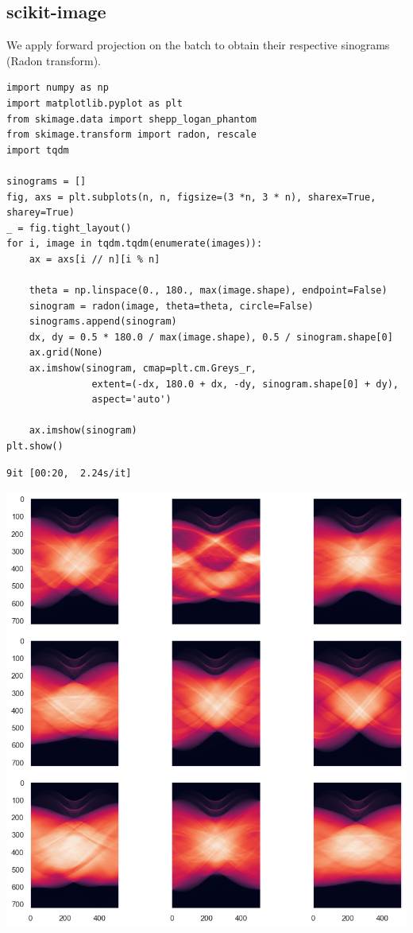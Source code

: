 \documentclass[a4paper, 11pt]{article}
\begin{document}
\subsection{scikit-image}
\label{sec:org595aee9}
We apply forward projection on the batch to obtain their respective sinograms (Radon transform).
\begin{verbatim}
import numpy as np
import matplotlib.pyplot as plt
from skimage.data import shepp_logan_phantom
from skimage.transform import radon, rescale
import tqdm

sinograms = []
fig, axs = plt.subplots(n, n, figsize=(3 *n, 3 * n), sharex=True, sharey=True)
_ = fig.tight_layout()
for i, image in tqdm.tqdm(enumerate(images)):
    ax = axs[i // n][i % n]

    theta = np.linspace(0., 180., max(image.shape), endpoint=False)
    sinogram = radon(image, theta=theta, circle=False)
    sinograms.append(sinogram)
    dx, dy = 0.5 * 180.0 / max(image.shape), 0.5 / sinogram.shape[0]
    ax.grid(None)
    ax.imshow(sinogram, cmap=plt.cm.Greys_r,
               extent=(-dx, 180.0 + dx, -dy, sinogram.shape[0] + dy),
               aspect='auto')

    ax.imshow(sinogram)
plt.show()
\end{verbatim}

\begin{verbatim}
9it [00:20,  2.24s/it]

\end{verbatim}

\begin{center}
\includegraphics[width=.9\linewidth]{./.ob-jupyter/dc176021f0a9c60e509498d6f9d407a2ec448a35.png}
\end{center}
\end{document}
